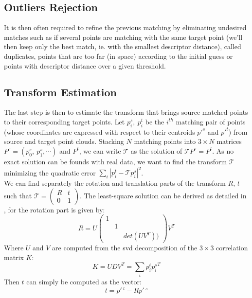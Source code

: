 \subsection{Outliers Rejection} 

    It is then often required to refine the previous matching by eliminating undesired matches such as if several points are matching with the same target point (we'll then keep only the best match, ie. with the smallest descriptor distance), called duplicates, points that are too far (in space) according to the initial guess or points with descriptor distance over a given threshold.
    
\subsection{Transform Estimation} 
    
    The last step is then to estimate the transform that brings source matched points to their corresponding target points. Let $p_i^s, \:p_i^t$ be the $i^{th}$ matching pair of points (whose coordinates are expressed with respect to their centroids $p'^s$ and $p'^t$) from source and target point clouds. Stacking $N$ matching points into $3\times N$ matrices $P^s = \left ( p_0^s,\:p_1^s, \cdots  \right )$ and $P^t$, we can write $\mathcal{T}$ as the solution of $\mathcal{T}P^s = P^t$. As no exact solution can be founds with real data, we want to find the transform $\mathcal{T}$ minimizing the quadratic error $\sum_i\left | p_i^t - \mathcal{T}p_i^s \right |^2$. \\
    We can find separately the rotation and translation parts of the transform $R$, $t$ such that 
    $\mathcal{T}=\begin{pmatrix}
    R & t\\ 
    0 & 1
    \end{pmatrix}$.
    The least-square solution can be derived as detailed in \cite{sork2017}, for the rotation part is given by: 
    \[
    R=U\begin{pmatrix}
    1 &  & \\ 
     & 1 & \\ 
     &  & det(UV^T))
    \end{pmatrix}V^T
    \]
    Where $U$ and $V$ are computed from the \acrshort{svd} decomposition of the $3\times 3$ correlation matrix $K$:
    \[
    K=UDV^T=\sum_i p_i^t{p_i^s}^T
    \]
    Then $t$ can simply be computed as the vector: 
    \[
        t=p'\,^t-Rp'\,^s
    \]

